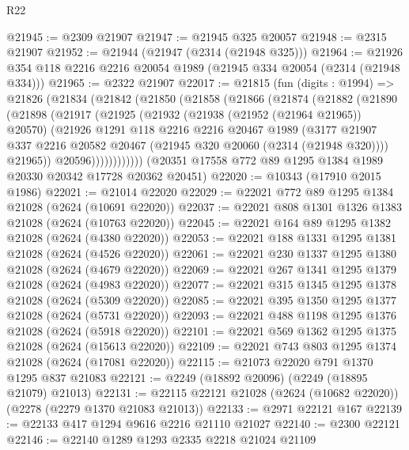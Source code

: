 \begin{lexlean}{R22}
\begin{coremodule}
@21945 := @2309 @21907
@21947 := @21945 @325 @20057
@21948 := @2315 @21907
@21952 := @21944 (@21947 (@2314 (@21948 @325)))
@21964 := @21926 @354 @118 @2216 @2216 @20054 @1989 (@21945 @334 @20054 (@2314 (@21948 @334)))
@21965 := @2322 @21907
@22017 := @21815
    (fun (digits : @1994) =>
    @21826
      (@21834
        (@21842
          (@21850
            (@21858
              (@21866
                (@21874
                  (@21882
                    (@21890
                      (@21898
                        (@21917
                          (@21925
                            (@21932
                              (@21938 (@21952 (@21964 @21965)) @20570)
                              (@21926
                                @1291
                                @118
                                @2216
                                @2216
                                @20467
                                @1989
                                (@3177
                                  @21907
                                  @337
                                  @2216
                                  @20582
                                  @20467
                                  (@21945 @320 @20060 (@2314 (@21948 @320))))
                                @21965))
                            @20596))))))))))))
    (@20351 @17558 @772 @89 @1295 @1384 @1989 @20330 @20342 @17728 @20362 @20451)
@22020 := @10343 (@17910 @2015 @1986)
@22021 := @21014 @22020
@22029 := @22021 @772 @89 @1295 @1384 @21028 (@2624 (@10691 @22020))
@22037 := @22021 @808 @1301 @1326 @1383 @21028 (@2624 (@10763 @22020))
@22045 := @22021 @164 @89 @1295 @1382 @21028 (@2624 (@4380 @22020))
@22053 := @22021 @188 @1331 @1295 @1381 @21028 (@2624 (@4526 @22020))
@22061 := @22021 @230 @1337 @1295 @1380 @21028 (@2624 (@4679 @22020))
@22069 := @22021 @267 @1341 @1295 @1379 @21028 (@2624 (@4983 @22020))
@22077 := @22021 @315 @1345 @1295 @1378 @21028 (@2624 (@5309 @22020))
@22085 := @22021 @395 @1350 @1295 @1377 @21028 (@2624 (@5731 @22020))
@22093 := @22021 @488 @1198 @1295 @1376 @21028 (@2624 (@5918 @22020))
@22101 := @22021 @569 @1362 @1295 @1375 @21028 (@2624 (@15613 @22020))
@22109 := @22021 @743 @803 @1295 @1374 @21028 (@2624 (@17081 @22020))
@22115 := @21073 @22020 @791 @1370 @1295 @837 @21083
@22121 := @2249 (@18892 @20096) (@2249 (@18895 @21079) @21013)
@22131 := @22115 @22121 @21028 (@2624 (@10682 @22020)) (@2278 (@2279 @1370 @21083 @21013))
@22133 := @2971 @22121 @167
@22139 := @22133 @417 @1294 @9616 @2216 @21110 @21027
@22140 := @2300 @22121
@22146 := @22140 @1289 @1293 @2335 @2218 @21024 @21109

\end{coremodule}
\end{lexlean}
